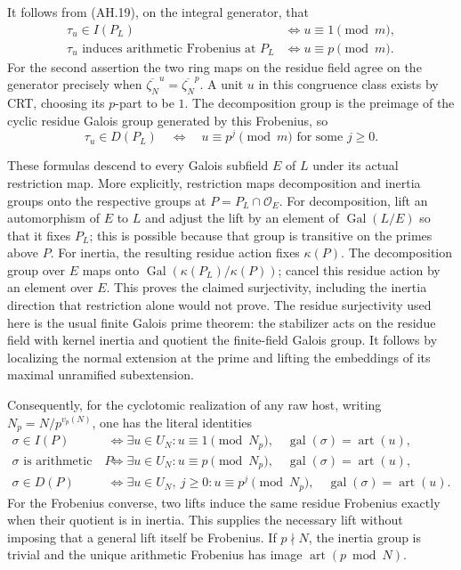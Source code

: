 It follows from (AH.19), on the integral generator, that
\[
 \begin{aligned}
 \tau_u\in I(P_L)&\Longleftrightarrow u\equiv1\pmod m,\\
 \tau_u\text{ induces arithmetic Frobenius at }P_L
      &\Longleftrightarrow u\equiv p\pmod m.
 \end{aligned}                                                   \tag{AH.20}
\]
For the second assertion the two ring maps on the residue field agree on
the generator precisely when $\overline{\zeta_N}^u=
\overline{\zeta_N}^{p}$. A unit $u$ in this congruence class exists by
CRT, choosing its $p$-part to be $1$. The decomposition group is the
preimage of the cyclic residue Galois group generated by this Frobenius,
so
\[
 \tau_u\in D(P_L)
       \quad\Longleftrightarrow\quad
       u\equiv p^j\pmod m\text{ for some }j\ge0.                \tag{AH.21}
\]

These formulas descend to every Galois subfield $E$ of $L$ under its
actual restriction map. More explicitly, restriction maps decomposition
and inertia groups onto the respective groups at $P=P_L\cap\mathcal O_E$.
For decomposition, lift an automorphism of $E$ to $L$ and adjust the
lift by an element of $\operatorname{Gal}(L/E)$ so that it fixes $P_L$;
this is possible because that group is transitive on the primes above
$P$. For inertia, the resulting residue action fixes $\kappa(P)$.
The decomposition group over $E$ maps onto
$\operatorname{Gal}(\kappa(P_L)/\kappa(P))$; cancel this residue action
by an element over $E$. This proves the claimed surjectivity, including
the inertia direction that restriction alone would not prove.
The residue surjectivity used here is the usual finite Galois prime
theorem: the stabilizer acts on the residue field with kernel inertia
and quotient the finite-field Galois group. It follows by localizing
the normal extension at the prime and lifting the embeddings of its
maximal unramified subextension.

Consequently, for the cyclotomic realization of any raw host, writing
$N_p=N/p^{v_p(N)}$, one has the literal identities
\[
 \begin{aligned}
 \sigma\in I(P)&\Longleftrightarrow
     \exists u\in U_N: u\equiv1\pmod{N_p},\quad
                       \operatorname{gal}(\sigma)=\operatorname{art}(u),\\
 \sigma\text{ is arithmetic Frobenius at }P&\Longleftrightarrow
     \exists u\in U_N: u\equiv p\pmod{N_p},\quad
                       \operatorname{gal}(\sigma)=\operatorname{art}(u),\\
 \sigma\in D(P)&\Longleftrightarrow
     \exists u\in U_N,\ j\ge0: u\equiv p^j\pmod{N_p},\quad
                       \operatorname{gal}(\sigma)=\operatorname{art}(u).
 \end{aligned}                                                   \tag{AH.22}
\]
For the Frobenius converse, two lifts induce the same residue Frobenius
exactly when their quotient is in inertia. This supplies the necessary
lift without imposing that a general lift itself be Frobenius. If $p\nmid N$,
the inertia group is trivial and the unique arithmetic Frobenius has
image $\operatorname{art}(p\bmod N)$.

